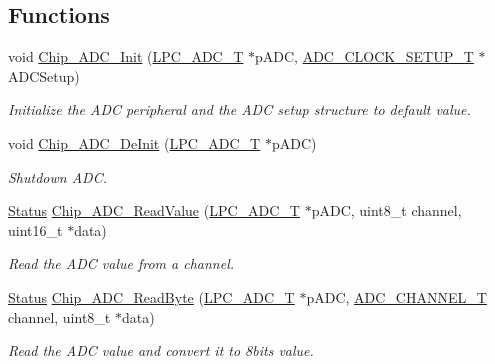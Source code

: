 \subsection*{Functions}
\begin{DoxyCompactItemize}
\item 
void \hyperlink{group___a_d_c__18_x_x__43_x_x_ga459b17621657a66281f2bc9baae3626c}{Chip\+\_\+\+A\+D\+C\+\_\+\+Init} (\hyperlink{struct_l_p_c___a_d_c___t}{L\+P\+C\+\_\+\+A\+D\+C\+\_\+T} $\ast$p\+A\+DC, \hyperlink{struct_a_d_c___c_l_o_c_k___s_e_t_u_p___t}{A\+D\+C\+\_\+\+C\+L\+O\+C\+K\+\_\+\+S\+E\+T\+U\+P\+\_\+T} $\ast$A\+D\+C\+Setup)
\begin{DoxyCompactList}\small\item\em Initialize the A\+DC peripheral and the A\+DC setup structure to default value. \end{DoxyCompactList}\item 
void \hyperlink{group___a_d_c__18_x_x__43_x_x_ga749cff51066bd49acaca0497d78f3332}{Chip\+\_\+\+A\+D\+C\+\_\+\+De\+Init} (\hyperlink{struct_l_p_c___a_d_c___t}{L\+P\+C\+\_\+\+A\+D\+C\+\_\+T} $\ast$p\+A\+DC)
\begin{DoxyCompactList}\small\item\em Shutdown A\+DC. \end{DoxyCompactList}\item 
\hyperlink{group___l_p_c___types___public___types_ga67a0db04d321a74b7e7fcfd3f1a3f70b}{Status} \hyperlink{group___a_d_c__18_x_x__43_x_x_gab6374a3aa75b052970c472ee2e9f600e}{Chip\+\_\+\+A\+D\+C\+\_\+\+Read\+Value} (\hyperlink{struct_l_p_c___a_d_c___t}{L\+P\+C\+\_\+\+A\+D\+C\+\_\+T} $\ast$p\+A\+DC, uint8\+\_\+t channel, uint16\+\_\+t $\ast$data)
\begin{DoxyCompactList}\small\item\em Read the A\+DC value from a channel. \end{DoxyCompactList}\item 
\hyperlink{group___l_p_c___types___public___types_ga67a0db04d321a74b7e7fcfd3f1a3f70b}{Status} \hyperlink{group___a_d_c__18_x_x__43_x_x_ga5dc774072fa55b145e57a25c1a146535}{Chip\+\_\+\+A\+D\+C\+\_\+\+Read\+Byte} (\hyperlink{struct_l_p_c___a_d_c___t}{L\+P\+C\+\_\+\+A\+D\+C\+\_\+T} $\ast$p\+A\+DC, \hyperlink{group___a_d_c__18_x_x__43_x_x_ga30ee7058bc7cc1daff718b29b42bed4e}{A\+D\+C\+\_\+\+C\+H\+A\+N\+N\+E\+L\+\_\+T} channel, uint8\+\_\+t $\ast$data)
\begin{DoxyCompactList}\small\item\em Read the A\+DC value and convert it to 8bits value. \end{DoxyCompactList}\item 

\end{DoxyCompactItemize}

